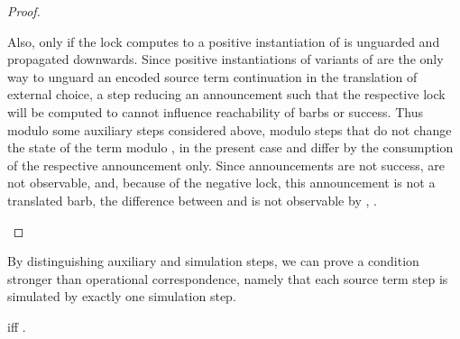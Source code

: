 \documentclass[]{eptcs}
\begin{document}
\begin{proof}
\begin{compactenum}
			Also, only if the lock computes to  a positive instantiation of  is unguarded and propagated downwards. Since positive instantiations of variants of  are the only way to unguard an encoded source term continuation in the translation of external choice, a step reducing an announcement such that the respective lock will be computed to  cannot influence reachability of barbs or success.
			Thus modulo some auxiliary steps considered above, \ie modulo steps that do not change the state of the term modulo , in the present case  and  differ by the consumption of the respective announcement only. Since announcements are not success, are not observable, and, because of the negative lock, this announcement is not a translated barb, the difference between  and  is not observable by , \ie .
	\end{compactenum}
\end{proof}

By distinguishing auxiliary and simulation steps, we can prove a condition stronger than operational correspondence, namely that each source term step is simulated by exactly one simulation step.

\begin{lemma}
	 iff .
	\label{lem:sourceVsSimStep}
\end{lemma}
\end{document}
